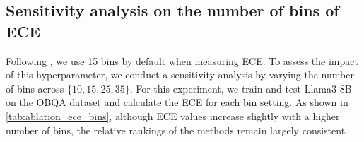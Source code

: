 % 
\begin{table}[t]
    \centering
    \caption{Comparison of computational efficiency for various methods using Llama3-8B on the OBQA. IB-EDL demonstrates comparable training and inference speeds as well as memory consumption compared to MAP and other EDL methods, confirming its computational efficiency.}
    \label{tab:train_test_consumption}
\end{table}

\subsection{Sensitivity analysis on the number of bins of ECE}\label{sec:app:ablation_ece_bins}
Following \cite{yang2024lalora}, we use 15 bins by default when measuring ECE. To assess the impact of this hyperparameter, we conduct a sensitivity analysis by varying the number of bins across $\{10, 15, 25, 35\}$. For this experiment, we train and test Llama3-8B on the OBQA dataset and calculate the ECE for each bin setting. As shown in \cref{tab:ablation_ece_bins}, although ECE values increase slightly with a higher number of bins, the relative rankings of the methods remain largely consistent.


